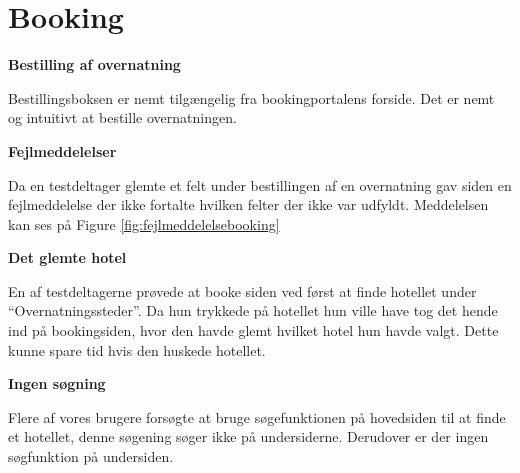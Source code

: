 \documentclass[10pt,a4paper]{article}      %
\newcommand\pic[1]{\texttt{[image: Pics/\#1]}}
\renewcommand\good{\pic{good}}
\renewcommand\goodidea{\pic{goodidea}}
\renewcommand\smallproblem{\pic{smallproblem}}
\renewcommand\seriousproblem{\pic{seriousproblem}}
\begin{document}
\section{Booking}
\begin{kommentarer}
\item[\good]{\textbf{Bestilling af overnatning}}

Bestillingsboksen er nemt tilgængelig fra bookingportalens forside. Det er nemt og intuitivt at bestille overnatningen.

\item[\smallproblem]{\textbf{Fejlmeddelelser}}

Da en testdeltager glemte et felt under bestillingen af en overnatning gav siden en fejlmeddelelse der ikke fortalte hvilken felter der ikke var udfyldt. Meddelelsen kan ses på Figure \ref{fig:fejlmeddelelsebooking}

\item[\goodidea]{\textbf{Det glemte hotel}}

En af testdeltagerne prøvede at booke siden ved først at finde hotellet under ``Overnatningssteder''. Da hun trykkede på hotellet hun ville have tog det hende ind på bookingsiden, hvor den havde glemt hvilket hotel hun havde valgt. Dette kunne spare tid hvis den huskede hotellet.

\item[\seriousproblem]{\textbf{Ingen søgning}}

Flere af vores brugere forsøgte at bruge søgefunktionen på hovedsiden til at finde et hotellet, denne søgening søger ikke på undersiderne. Derudover er der ingen søgfunktion på undersiden.

\end{kommentarer}
\end{document}
